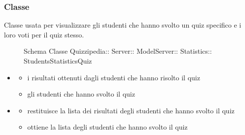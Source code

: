 \subsubsection{Classe }
Classe usata per visualizzare gli studenti che hanno svolto un quiz specifico e i loro voti per il quiz stesso.
\begin{figure}[H]
\centering
\noindent{}
\caption[Schema Classe StudentsStatisticsQuiz]{Schema Classe Quizzipedia:: Server:: ModelServer:: Statistics:: StudentsStatisticsQuiz}
\end{figure}
\begin{itemize}
\item {}
\begin{itemize}
\item {}
\newline
i risultati ottenuti dagli studenti che hanno risolto il quiz
\item {}
\newline
gli studenti che hanno svolto il quiz
\end{itemize}
\item {}
\begin{itemize}
\item {}
\newline
restituisce la lista dei risultati degli studenti che hanno svolto il quiz
\newline
\item {}
\newline
ottiene la lista degli studenti che hanno svolto il quiz
\newline
\end{itemize}
\end{itemize}
